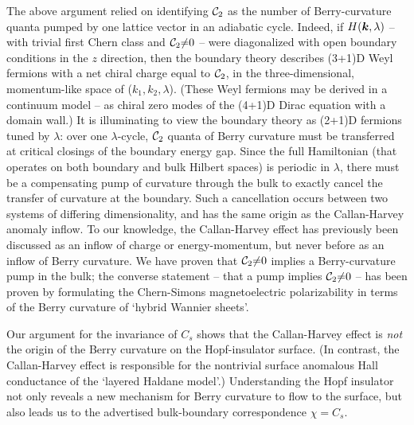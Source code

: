 \documentclass[aps,prl,showpacs,twocolumn,superscriptaddress]{revtex4-1}
\begin{document}
The above argument relied on identifying ${\cal C}_2$ as the number of Berry-curvature quanta pumped by one lattice vector in an adiabatic cycle. Indeed, if $H(\boldsymbol{k},\lambda)$ -- with trivial first Chern class and ${\cal C}_2{\neq}0$ -- were diagonalized with open boundary conditions in the $z$ direction, then the boundary theory describes (3+1)D Weyl fermions with a net chiral charge\cite{nielsen_ninomiya} equal to ${\cal C}_2$, in the three-dimensional, momentum-like space of ($k_1,k_2,\lambda$).\cite{olsen_surfacetheoremCSA} (These Weyl fermions may be derived in a continuum model -- as chiral zero modes of the (4+1)D Dirac equation with a domain wall.\cite{callanharvey_anomalies,qi_topologicalfieldtheory}) It is illuminating to view the boundary theory as (2+1)D fermions tuned by $\lambda$:  over one $\lambda$-cycle, ${\cal C}_2$ quanta of Berry curvature must be transferred at critical closings of the boundary energy gap. Since the full Hamiltonian (that operates on both boundary and bulk Hilbert spaces) is periodic in $\lambda$, there must be a compensating pump of curvature through the bulk to exactly cancel the transfer of curvature at the boundary. Such a cancellation occurs between two systems of differing dimensionality, and has the same origin as the  Callan-Harvey anomaly inflow.\cite{callanharvey_anomalies,golterman_chiralfermions,stone_edgewaves} To our knowledge, the Callan-Harvey effect has previously been discussed  as an inflow of charge or energy-momentum, but never before as an inflow of Berry curvature. We have proven that ${\cal C}_2{\neq} 0$ implies a Berry-curvature pump in the bulk; the converse statement -- that a pump implies ${\cal C}_2{\neq}0$ -- has been proven by formulating the Chern-Simons magnetoelectric polarizability in terms of the Berry curvature of `hybrid Wannier sheets'.\cite{maryam_adiabaticpumpCSA,olsen_surfacetheoremCSA}  

Our argument for the invariance of $C_s$ shows that the Callan-Harvey effect is \textit{not} the origin of the Berry curvature on the Hopf-insulator surface. (In contrast, the Callan-Harvey effect is responsible for the nontrivial  surface anomalous Hall conductance of the `layered Haldane model'.\cite{olsen_surfacetheoremCSA})  Understanding the Hopf insulator not only reveals a new mechanism for Berry curvature to flow to the surface,  but also leads us to the advertised bulk-boundary correspondence $\chi{=}C_s.$ 

\end{document}
